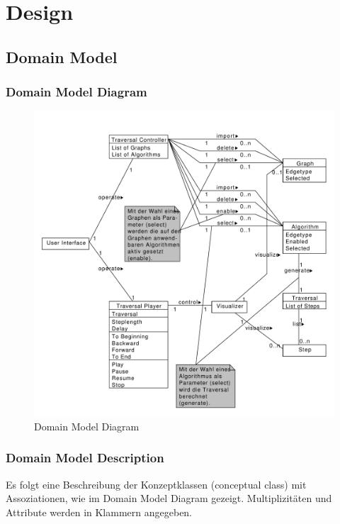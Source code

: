 \newpage		%
\mbox{} 		%
\thispagestyle{empty} 	%
\chapter{Design}
% 
\section{Domain Model}
\label{sec:Domain Model}
% 
\subsection{Domain Model Diagram}
\label{subsec:Domain Model Diagram}
\begin{figure}[H]
    \includegraphics[totalheight=0.6\textheight]{diagrams/domain-model-diagram.pdf}
    \caption{Domain Model Diagram}
    \label{fig:domain_model_diagram}
\end{figure}
% 
\subsection{Domain Model Description}
\label{subsec:Domain Model Description}
Es folgt eine Beschreibung der Konzeptklassen (conceptual class) mit Assoziationen, wie im Domain Model Diagram gezeigt. Multiplizit\"aten und Attribute werden in Klammern angegeben.
% 
